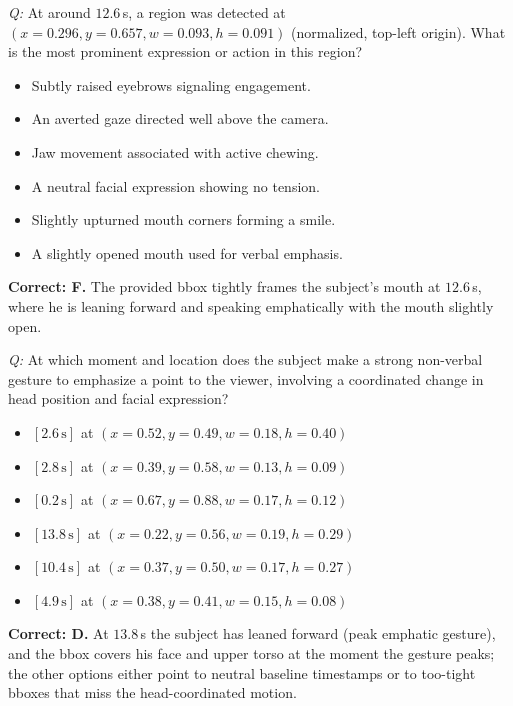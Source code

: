 \documentclass{llmxive}
\begin{document}
\begin{examplebox}[title={(6) Spatial Localization Verification}]
\emph{Q:} At around $12.6$\,s, a region was detected at $(x{=}0.296, y{=}0.657, w{=}0.093, h{=}0.091)$ (normalized, top-left origin). What is the most prominent expression or action in this region?
\begin{itemize}[leftmargin=1.4em, itemsep=0pt, topsep=1pt, parsep=0pt]
\item[A.] Subtly raised eyebrows signaling engagement.
\item[B.] An averted gaze directed well above the camera.
\item[C.] Jaw movement associated with active chewing.
\item[D.] A neutral facial expression showing no tension.
\item[E.] Slightly upturned mouth corners forming a smile.
\item[F.] A slightly opened mouth used for verbal emphasis.
\end{itemize}
\textbf{Correct: F.}  The provided bbox tightly frames the subject's mouth at $12.6$\,s, where he is leaning forward and speaking emphatically with the mouth slightly open.

\end{examplebox}
\begin{examplebox}[title={(7) Temporal-Spatial Joint Localization}]
\emph{Q:} At which moment and location does the subject make a strong non-verbal gesture to emphasize a point to the viewer, involving a coordinated change in head position and facial expression?
\begin{itemize}[leftmargin=1.4em, itemsep=0pt, topsep=1pt, parsep=0pt]
\item[A.] $[2.6\,\text{s}]$ at $(x{=}0.52, y{=}0.49, w{=}0.18, h{=}0.40)$
\item[B.] $[2.8\,\text{s}]$ at $(x{=}0.39, y{=}0.58, w{=}0.13, h{=}0.09)$
\item[C.] $[0.2\,\text{s}]$ at $(x{=}0.67, y{=}0.88, w{=}0.17, h{=}0.12)$
\item[D.] $[13.8\,\text{s}]$ at $(x{=}0.22, y{=}0.56, w{=}0.19, h{=}0.29)$
\item[E.] $[10.4\,\text{s}]$ at $(x{=}0.37, y{=}0.50, w{=}0.17, h{=}0.27)$
\item[F.] $[4.9\,\text{s}]$ at $(x{=}0.38, y{=}0.41, w{=}0.15, h{=}0.08)$
\end{itemize}
\textbf{Correct: D.}  At $13.8$\,s the subject has leaned forward (peak emphatic gesture), and the bbox covers his face and upper torso at the moment the gesture peaks; the other options either point to neutral baseline timestamps or to too-tight bboxes that miss the head-coordinated motion.
\end{examplebox}
\end{document}
